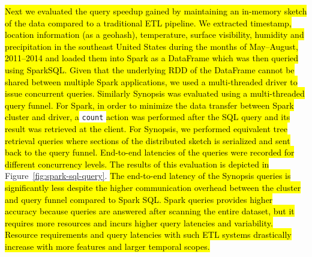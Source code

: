 \hl{Next we evaluated the query speedup gained by maintaining an in-memory sketch of the data compared to a traditional ETL pipeline.
We extracted timestamp, location information (as a geohash), temperature, surface visibility, humidity and precipitation in the southeast United States during the months of May--August, 2011--2014 and loaded them into Spark as a DataFrame which was then queried using SparkSQL.
Given that the underlying RDD of the DataFrame cannot be shared between multiple Spark applications, we used a multi-threaded driver to issue concurrent queries.
Similarly Synopsis was evaluated using a multi-threaded query funnel.
For Spark, in order to minimize the data transfer between Spark cluster and driver, a} \texttt{count} \hl{action was performed after the SQL query and its result was retrieved at the client.
For Synopsis, we performed equivalent tree retrieval queries where sections of the distributed sketch is serialized and sent back to the query funnel.
End-to-end latencies of the queries were recorded for different concurrency levels.
The results of this evaluation is depicted in} Figure~\ref{fig:spark-sql-query}.
\hl{The end-to-end latency of the Synopsis queries is significantly less despite the higher communication overhead between the cluster and query funnel compared to Spark SQL.
Spark queries provides higher accuracy because queries are answered after scanning the entire dataset, but it requires more resources and incurs higher query latencies and variability.
Resource requirements and query latencies with such ETL systems drastically increase with more features and larger temporal scopes.}


